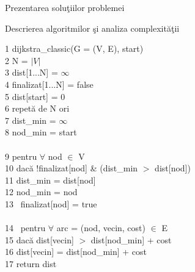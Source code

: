 \documentclass[a4paper]{article}
\begin{document}
\begin{section}{Prezentarea solu\c tiilor problemei\\}
\begin{subsection}{Descrierea algoritmilor \c si analiza complexit\u a\c tii\\}
\begin{enumerate}
	1 \quad dijkstra\_classic(G = (V, E), start) \\
	2 \quad\quad\quad N = $|V|$ \\
	3 \quad\quad\quad dist[1...N] = $\infty$ \\
	4 \quad\quad\quad finalizat[1...N] = false \\
	5 \quad\quad\quad dist[start] = 0\\[0.2cm]
	6 \quad\quad\quad  repet\u a de N ori \\
	7 \quad\quad\quad\quad\quad dist\_min = $\infty$ \\
	8 \quad\quad\quad\quad\quad nod\_min = start \\ \\
	9 \quad\quad\quad\quad\quad pentru $\forall$ nod $\in$ V \\
	10 \quad\quad\quad\quad\quad\quad dac\u a !finalizat[nod] \& (dist\_min $>$ dist[nod]) \\
	11 \quad\quad\quad\quad\quad\quad\quad\quad dist\_min = dist[nod] \\
	12 \quad\quad\quad\quad\quad\quad\quad\quad nod\_min = nod \\[0.2cm]
	13 \quad\quad\quad\quad\quad\quad\ finalizat[nod] = true \\ \\
	14 \quad\quad\quad\quad\quad\quad\ pentru $\forall$ arc = (nod, vecin, cost) $\in$ E \\
 	15 \quad\quad\quad\quad\quad\quad\quad\quad dac\u a dist[vecin] $>$ dist[nod\_min] + cost \\
	16 \quad\quad\quad\quad\quad\quad\quad\quad\quad\quad  dist[vecin] = dist[nod\_min] + cost \\[0.2cm]
	17 \quad\quad\quad return dist \\[0.3cm]


\end{enumerate}
\end{subsection}
\end{section}
\end{document}
